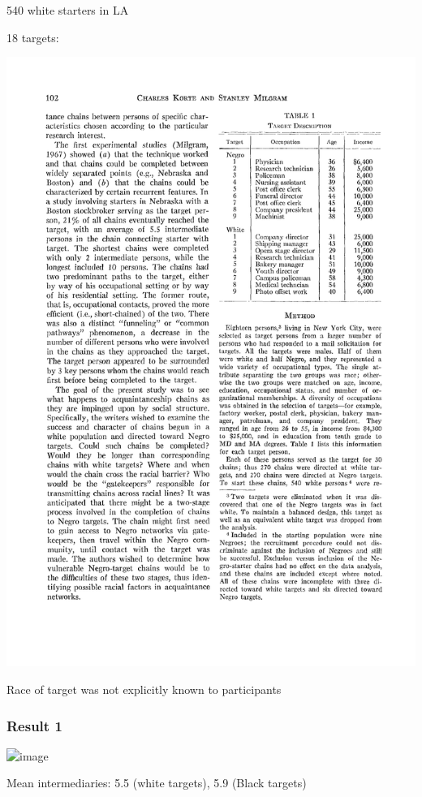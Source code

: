 \documentclass[aspectratio=169]{beamer}
\begin{document}
\begin{frame}

540 white starters in LA\\
\pause

18 targets:
\begin{center}
\includegraphics[height=0.6\textheight]{figures/korte_aquaintance_1970_tab1}
\end{center}

\vfill
Race of target was not explicitly known to participants


\end{frame}
\begin{frame}
\frametitle{Result 1}

\begin{center}
\includegraphics<1>[height=0.8\textheight]{figures/korte_aquaintance_1970_fig1}
\end{center}

Mean intermediaries: 5.5 (white targets), 5.9 (Black targets)

\end{frame}
\end{document}
